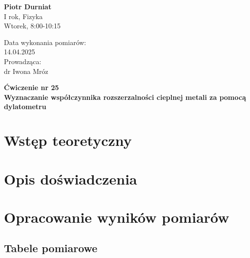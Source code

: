 \documentclass[a4paper,12pt]{article}
\begin{document}
\noindent
\begin{minipage}{0.5\textwidth}
    \raggedright
    \textbf{Piotr Durniat} \\
    I rok, Fizyka \\
    Wtorek, 8:00-10:15 \\
    \vspace{0.5cm}
    \vspace{0.5cm}
\end{minipage}%
\begin{minipage}{0.5\textwidth}
    \raggedleft
    Data wykonania pomiarów: \\
    14.04.2025 \\
    \vspace{0.5cm} %
    Prowadząca: \\
    dr Iwona Mróz
\end{minipage}

\vspace{2cm} %
\begin{center}
    \LARGE \textbf{Ćwiczenie nr 25} \\[0.5cm]
    \Large \textbf{Wyznaczanie współczynnika rozszerzalności cieplnej metali za pomocą dylatometru}
\end{center}

\vspace{1cm} %
\noindent

\tableofcontents
\newpage

\section{Wstęp teoretyczny}

\section{Opis doświadczenia}

\section{Opracowanie wyników pomiarów}




\subsection{Tabele pomiarowe}
\end{document}
